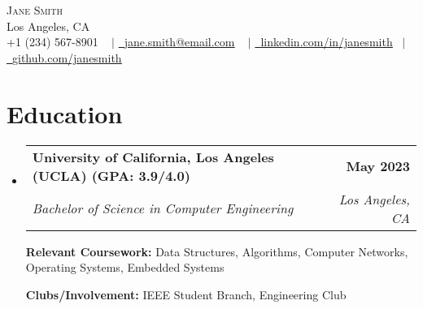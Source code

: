 \documentclass[letterpaper,11pt]{article}
\makeatletter
\newcommand{\resumeSubheading}[4]{
  \vspace{-2pt}\item
    \begin{tabular*}{1.0\textwidth}[t]{l@{\extracolsep{\fill}}r}
      \textbf{#1} & \textbf{\small #2} \\
      \textit{\small#3} & \textit{\small #4} \\
    \end{tabular*}\vspace{-7pt}
}
\newcommand{\resumeSubHeadingListStart}{\begin{itemize}[leftmargin=0.0in, label={}]}
\newcommand{\resumeSubHeadingListEnd}{\end{itemize}}
\makeatother
\begin{document}


\begin{center}
    {\Huge \scshape  Jane Smith  } \\ \vspace{1pt}
                \vspace{-1pt}
    Los Angeles, CA \\ \vspace{0pt}
            \vspace{0pt}
    \small \raisebox{-0.1\height} +1 (234) 567-8901 ~ $\vert$ \href{mailto:jane.smith@email.com}{\raisebox{-0.2\height}\ \underline{jane.smith@email.com}} ~ $\vert$
        \vspace{4pt}
    \href{https://linkedin.com/in/janesmith}{\raisebox{-0.2\height}\ \underline{linkedin.com/in/janesmith}}  ~$\vert$
    \href{https://github.com/janesmith}{\raisebox{-0.2\height}\ \underline{github.com/janesmith}}

    \vspace{-14pt}
\end{center}


\section{Education}
  \resumeSubHeadingListStart
    \resumeSubheading
      {University of California, Los Angeles (UCLA) (GPA: 3.9/4.0)}{May 2023}
      {Bachelor of Science in Computer Engineering}{Los Angeles, CA}
          \vspace{-2pt}

    {\textbf{Relevant Coursework:}  Data Structures, Algorithms, Computer Networks, Operating Systems, Embedded Systems}
          \vspace{-2pt}

    {\textbf{Clubs/Involvement:} IEEE Student Branch, Engineering Club}

  \resumeSubHeadingListEnd

\end{document}
